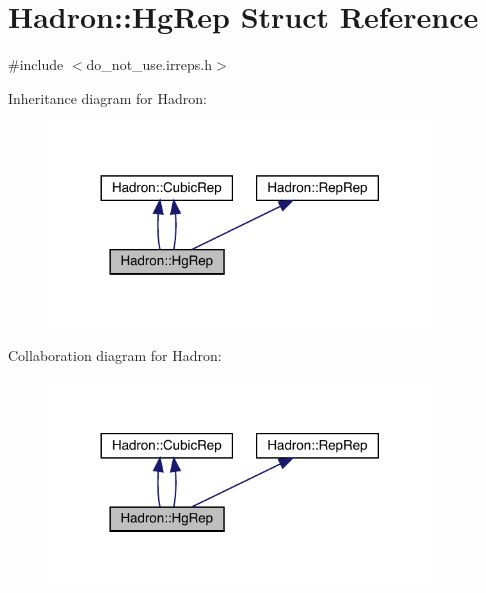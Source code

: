 \hypertarget{structHadron_1_1HgRep}{}\section{Hadron\+:\+:Hg\+Rep Struct Reference}
\label{structHadron_1_1HgRep}


{\ttfamily \#include $<$do\+\_\+not\+\_\+use.\+irreps.\+h$>$}



Inheritance diagram for Hadron\+:\nopagebreak
\begin{figure}[H]
\begin{center}
\leavevmode
\includegraphics[width=288pt]{d1/d06/structHadron_1_1HgRep__inherit__graph}
\end{center}
\end{figure}


Collaboration diagram for Hadron\+:\nopagebreak
\begin{figure}[H]
\begin{center}
\leavevmode
\includegraphics[width=288pt]{d6/d9d/structHadron_1_1HgRep__coll__graph}
\end{center}
\end{figure}
